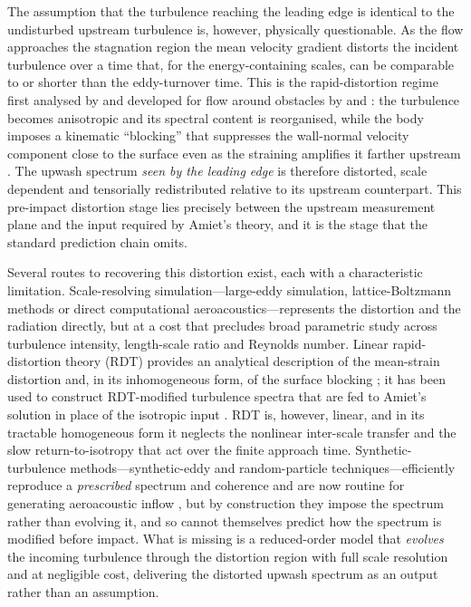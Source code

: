 \documentclass[lineno]{JFM-FLM_Au}
\newcounter{assumption}
\begin{document}
The assumption that the turbulence reaching the leading edge is identical
to the undisturbed upstream turbulence is, however, physically
questionable. As the flow approaches the stagnation region the mean
velocity gradient distorts the incident turbulence over a time that, for
the energy-containing scales, can be comparable to or shorter than the
eddy-turnover time. This is the rapid-distortion regime first analysed by
\citet{BatchelorProudman1954} and developed for flow around obstacles by
\citet{Hunt1973} and \citet{Goldstein1978}: the turbulence becomes
anisotropic and its spectral content is reorganised, while the body
imposes a kinematic ``blocking'' that suppresses the wall-normal velocity
component close to the surface even as the straining amplifies it farther
upstream \citep{HuntGraham1978,GoldsteinAtassi1976}. The upwash spectrum
\emph{seen by the leading edge} is therefore distorted, scale dependent
and tensorially redistributed relative to its upstream counterpart. This
pre-impact distortion stage lies precisely between the upstream
measurement plane and the input required by Amiet's theory, and it is the
stage that the standard prediction chain omits.

Several routes to recovering this distortion exist, each with a
characteristic limitation. Scale-resolving simulation---large-eddy
simulation, lattice-Boltzmann methods or direct computational
aeroacoustics---represents the distortion and the radiation directly, but
at a cost that precludes broad parametric study across turbulence
intensity, length-scale ratio and Reynolds number. Linear rapid-distortion
theory (RDT) provides an analytical description of the mean-strain
distortion and, in its inhomogeneous form, of the surface blocking
\citep{HuntCarruthers1990,GoldsteinAfsarLeib2013}; it has been used to
construct RDT-modified turbulence spectra that are fed to Amiet's solution
in place of the isotropic input \citep{deSantana2016}. RDT is, however,
linear, and in its tractable homogeneous form it neglects the nonlinear
inter-scale transfer and the slow return-to-isotropy that act over the
finite approach time. Synthetic-turbulence methods---synthetic-eddy and
random-particle techniques---efficiently reproduce a \emph{prescribed}
spectrum and coherence and are now routine for generating aeroacoustic
inflow \citep{KimHaeri2015}, but by construction they impose the spectrum
rather than evolving it, and so cannot themselves predict how the spectrum
is modified before impact. What is missing is a reduced-order model that
\emph{evolves} the incoming turbulence through the distortion region with
full scale resolution and at negligible cost, delivering the distorted
upwash spectrum as an output rather than an assumption.
\end{document}
